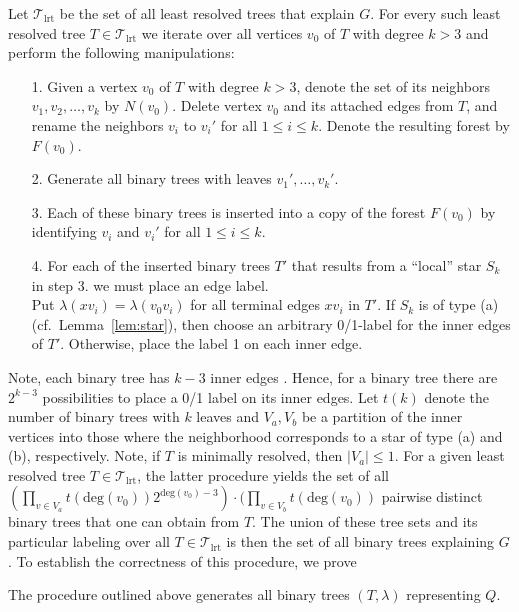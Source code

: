 \documentclass[smallextended]{svjour3}
\let\cite\citep
\newcommand{\rev}[1]{\begingroup\color{blue}#1\endgroup}
\begin{document}
\rev{Let $\mathcal{T}_{\mathrm{lrt}}$ be the set of all least resolved
trees that explain $G$. 
For every such least resolved tree $T\in \mathcal{T}_{\mathrm{lrt}}$ } we iterate
over all vertices $v_0$ of $T$ with degree $k>3$ and perform the following
manipulations:
\begin{itemize}
\item[{1.}] Given a vertex $v_0$ of $T$ with degree $k>3$, denote the set of 
	its  neighbors $v_1, v_2,\dots, v_k$  by $N(v_0)$. 
	Delete vertex $v_0$ and its attached
  edges from $T$, and rename the neighbors $v_i$ to $v_i'$ for all $1\leq
  i\leq k$. Denote the resulting forest by $F(v_0)$.
\item[{2.}] Generate all binary trees with leaves $v_1',\dots, v_k'$. 
\item[{3.}] Each of these binary trees is inserted into a copy of the
  forest $F(v_0)$ by \rev{identifying} $v_i$ and $v_i'$ for all $1\leq
  i\leq k$.
\item[{4.}] \rev{
  For each of the inserted binary trees $T'$ that results 
  from a ``local'' star $S_k$ in step 3. we must place an edge label. \\
  Put $\lambda(xv_i)= \lambda(v_0v_i)$ for all terminal edges $xv_i$ in $T'$.
  If $S_k$ is of type  (a)  (cf.\, Lemma~\ref{lem:star}),  
 then choose an arbitrary 0/1-label  for the inner edges of $T'$.
 Otherwise, place the label 1 on each   inner edge. }
\end{itemize}
\rev{Note, each binary tree has $k-3$ inner edges \cite{sem-ste-03a}. 
Hence, for a binary tree there are $2^{k-3}$ possibilities to place
a 0/1 label on its inner edges. 
Let $t(k)$ denote the number of binary trees with $k$ leaves
and $V_a,V_b$ be a partition of the inner vertices into those
where the neighborhood corresponds to a star of type  (a) and (b), 
respectively. Note, if $T$ is minimally resolved, then $|V_a|\le1$. 
For a given least resolved tree $T\in  \mathcal{T}_{\mathrm{lrt}}$, the latter procedure
yields the set of all
$ (\prod_{v\in V_a} t(\mathrm{deg}(v_0))2^{\mathrm{deg}(v_0)-3} ) \cdot  (\prod_{v\in V_b} t(\mathrm{deg}(v_0) ) $
pairwise distinct binary trees that one can obtain from $T$. The union of
these tree sets and its particular labeling over all $T\in  \mathcal{T}_{\mathrm{lrt}}$
is then the set of all binary trees explaining $G$.  }
To establish the correctness of this procedure, we prove
\newline
\begin{lemma}\label{lem:binary}  
  The procedure outlined above generates all binary trees $(T,\lambda)$
  representing $Q$.
\end{lemma}
\end{document}

